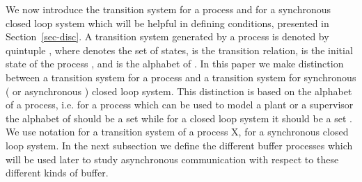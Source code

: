 \documentclass[a4paper,english,final]{article}
\theoremstyle{plain}
\theoremstyle{definition}
\begin{document}
We now introduce the transition system for a process and for a synchronous closed loop system which will be helpful in defining conditions, presented in Section~\ref{sec-disc}. A transition system generated by a process  is denoted by quintuple , where  denotes the set of states,  is the transition relation,  is the initial state of the process , and  is the alphabet of . In this paper we make distinction between a transition system for a process and a transition system for synchronous ( or asynchronous ) closed loop system. This distinction is based on the alphabet of a process, i.e. for a process  which can be used to model a plant or a supervisor the alphabet of  should be a set  while for a closed loop system  it should be a set . We use notation  for a transition system of a process X,  for a synchronous closed loop system. In the next subsection we define the different buffer processes which will be used later to study asynchronous communication with respect to these different kinds of buffer.
\end{document}
